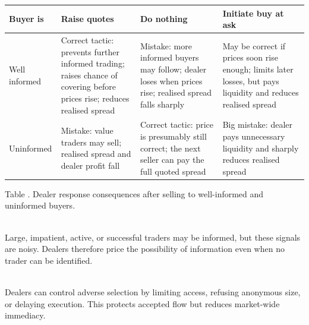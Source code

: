 \begin{table}[htbp]
\centering
\scriptsize
{}
\renewcommand{\arraystretch}{1.13}
\setlength{\tabcolsep}{4pt}
\begin{tabularx}{\textwidth}{@{}>{\RaggedRight\arraybackslash}p{} >{\RaggedRight\arraybackslash}p{} >{\RaggedRight\arraybackslash}p{} >{\RaggedRight\arraybackslash}X@{}}
\hline
\textbf{Buyer is} & \textbf{Raise quotes} & \textbf{Do nothing} & \textbf{Initiate buy at ask} \\
\hline
Well informed & Correct tactic: prevents further informed trading; raises chance of covering before prices rise; reduces realised spread & Mistake: more informed buyers may follow; dealer loses when prices rise; realised spread falls sharply & May be correct if prices soon rise enough; limits later losses, but pays liquidity and reduces realised spread \\
\hline
Uninformed & Mistake: value traders may sell; realised spread and dealer profit fall & Correct tactic: price is presumably still correct; the next seller can pay the full quoted spread & Big mistake: dealer pays unnecessary liquidity and sharply reduces realised spread \\
\hline
\end{tabularx}

\vspace{0.25em}
{\footnotesize Table \thetable. Dealer response consequences after selling to well-informed and uninformed buyers.}
\end{table}

\begin{caveat} \\
Large, impatient, active, or successful traders may be informed, but these signals are noisy. Dealers therefore price the possibility of information even when no trader can be identified.
\end{caveat}

\begin{caveat} \\
Dealers can control adverse selection by limiting access, refusing anonymous size, or delaying execution. This protects accepted flow but reduces market-wide immediacy.
\end{caveat}
